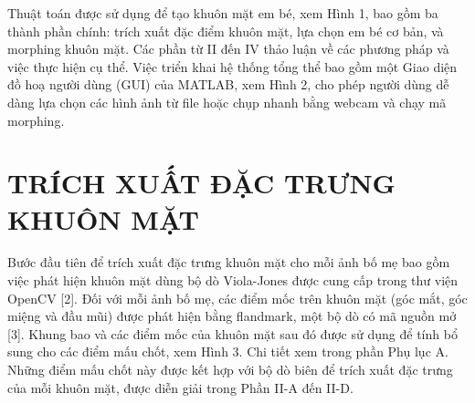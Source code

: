 \documentclass[journal]{IEEEtran}
\begin{document}
Thuật toán được sử dụng để tạo khuôn mặt em bé, xem Hình 1, bao gồm ba thành phần chính: trích xuất đặc điểm khuôn mặt, lựa chọn em bé cơ bản, và morphing khuôn mặt. Các phần từ II đến IV thảo luận về các phương pháp và việc thực hiện cụ thể. Việc triển khai hệ thống tổng thể bao gồm một Giao diện đồ hoạ người dùng (GUI) của MATLAB, xem Hình 2, cho phép người dùng dễ dàng lựa chọn các hình ảnh từ file hoặc chụp nhanh bằng webcam và chạy mã morphing.

\section{TRÍCH XUẤT ĐẶC TRƯNG KHUÔN MẶT}
Bước đầu tiên để trích xuất đặc trưng khuôn mặt cho mỗi ảnh bố mẹ bao gồm việc phát hiện khuôn mặt dùng bộ dò Viola-Jones được cung cấp trong thư viện OpenCV [2]. Đối với mỗi ảnh bố mẹ, các điểm mốc trên khuôn mặt (góc mắt, góc miệng và đầu mũi) được phát hiện bằng flandmark, một bộ dò có mã nguồn mở [3]. Khung bao và các điểm mốc của khuôn mặt sau đó được sử dụng để tính bổ sung cho các điểm mấu chốt, xem Hình 3. Chi tiết xem trong phần Phụ lục A. Những điểm mấu chốt này được kết hợp với bộ dò biên để trích xuất đặc trưng của mỗi khuôn mặt, được diễn giải trong Phần II-A đến II-D.
\end{document}

